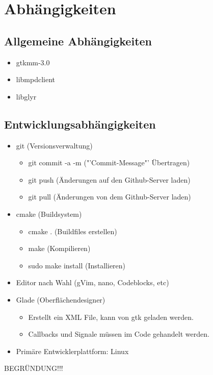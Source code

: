 \chapter{Abhängigkeiten}

\section{Allgemeine Abhängigkeiten}

\renewcommand{\labelitemi}{•}
\begin{itemize}
	\item gtkmm-3.0
	\item libmpdclient
	\item libglyr
\end{itemize}

\section{Entwicklungsabhängigkeiten}
\begin{itemize}
	\item git (Versionsverwaltung)
	\renewcommand{\labelitemi}{--}
	\begin{itemize}
		\item git commit -a -m ("'Commit-Message"' Übertragen)
		\item git push (Änderungen auf den Github-Server laden)
		\item git pull (Änderungen von dem Github-Server laden)
	\end{itemize}
	\renewcommand{\labelitemi}{•}
	\item cmake (Buildsystem)
	\renewcommand{\labelitemi}{--}
	\begin{itemize}
		\item cmake . (Buildfiles erstellen)
		\item make (Kompilieren)
		\item sudo make install (Installieren)
	\end{itemize}
	\renewcommand{\labelitemi}{•}
	\item Editor nach Wahl (gVim, nano, Codeblocks, etc)
	\item Glade (Oberflächendesigner)
	\renewcommand{\labelitemi}{--}
	\begin{itemize}
		\item Erstellt ein XML File, kann von gtk geladen werden.
		\item Callbacks und Signale müssen im Code gehandelt werden.
	\end{itemize}
	\renewcommand{\labelitemi}{•}
	\item Primäre Entwicklerplattform: Linux
\end{itemize}

BEGRÜNDUNG!!!